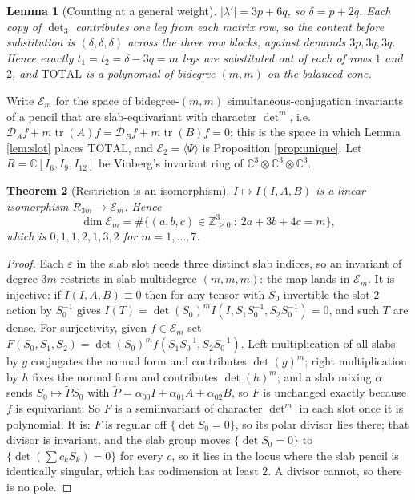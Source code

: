 \documentclass[11pt,reqno]{amsart}
\theoremstyle{plain}
\newtheorem{theorem}{Theorem}[section]
\newtheorem{lemma}[theorem]{Lemma}
\theoremstyle{definition}
\DeclareMathOperator{\tr}{tr}
\newcommand{\bC}{\mathbb{C}}
\newcommand{\bZ}{\mathbb{Z}}
\begin{document}
\begin{lemma}[Counting at a general weight]\label{lem:countpq}
$|\lambda'|=3p+6q$, so $\delta=p+2q$.  Each copy of $\det_3$ contributes one leg
from each matrix row, so the content before substitution is $(\delta,\delta,
\delta)$ across the three row blocks, against demands $3p,3q,3q$.  Hence exactly
$t_1=t_2=\delta-3q=m$ legs are substituted out of each of rows $1$ and $2$, and
$\mathrm{TOTAL}$ is a polynomial of bidegree $(m,m)$ on the balanced cone.
\end{lemma}

Write $\mathcal E_m$ for the space of bidegree-$(m,m)$ simultaneous-conjugation
invariants of a pencil that are slab-equivariant with character $\det^{m}$, i.e.
$\mathcal D_Af+m\tr(A)f=\mathcal D_Bf+m\tr(B)f=0$; this is the space in which
Lemma \ref{lem:slot} places $\mathrm{TOTAL}$, and $\mathcal E_2=\langle\Psi
\rangle$ is Proposition \ref{prop:unique}.  Let $R=\bC[I_6,I_9,I_{12}]$ be
Vinberg's invariant ring of $\bC^3\otimes\bC^3\otimes\bC^3$.

\begin{theorem}[Restriction is an isomorphism]\label{thm:restr}
$I\mapsto I(I,A,B)$ is a linear isomorphism $R_{3m}\to\mathcal E_m$.  Hence
\[
  \dim\mathcal E_m=\#\{(a,b,c)\in\bZ_{\ge0}^{3}\ :\ 2a+3b+4c=m\},
\]
which is $0,1,1,2,1,3,2$ for $m=1,\dots,7$.
\end{theorem}

\begin{proof}
Each $\varepsilon$ in the slab slot needs three distinct slab indices, so an
invariant of degree $3m$ restricts in slab multidegree $(m,m,m)$: the map lands
in $\mathcal E_m$.  It is injective: if $I(I,A,B)\equiv0$ then for any tensor
with $S_0$ invertible the slot-$2$ action by $S_0^{-1}$ gives
$I(T)=\det(S_0)^{m}I(I,S_1S_0^{-1},S_2S_0^{-1})=0$, and such $T$ are dense.  For
surjectivity, given $f\in\mathcal E_m$ set
$F(S_0,S_1,S_2)=\det(S_0)^{m}f(S_1S_0^{-1},S_2S_0^{-1})$.  Left multiplication
of all slabs by $g$ conjugates the normal form and contributes $\det(g)^{m}$;
right multiplication by $h$ fixes the normal form and contributes
$\det(h)^{m}$; and a slab mixing $\alpha$ sends $S_0\mapsto\tilde PS_0$ with
$\tilde P=\alpha_{00}I+\alpha_{01}A+\alpha_{02}B$, so $F$ is unchanged exactly
because $f$ is equivariant.  So $F$ is a semiinvariant of character $\det^{m}$
in each slot once it is polynomial.  It is: $F$ is regular off
$\{\det S_0=0\}$, so its polar divisor lies there; that divisor is invariant,
and the slab group moves $\{\det S_0=0\}$ to $\{\det(\sum c_kS_k)=0\}$ for every
$c$, so it lies in the locus where the slab pencil is identically singular,
which has codimension at least $2$.  A divisor cannot, so there is no pole.
\end{proof}
\end{document}
